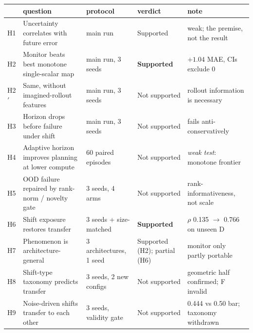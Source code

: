 \begin{tabular}{llllp{3.3cm}}
\toprule
& question & protocol & verdict & note \\
\midrule
H1 & Uncertainty correlates with future error & main run & Supported & weak; the premise, not the result \\
H2 & Monitor beats best monotone single-scalar map & main run, 3 seeds & \textbf{Supported} & $+1.04$ MAE, CIs exclude 0 \\
H2$'$ & Same, without imagined-rollout features & main run, 3 seeds & Not supported & rollout information is necessary \\
H3 & Horizon drops before failure under shift & main run, 3 seeds & Not supported & fails anti-conservatively \\
H4 & Adaptive horizon improves planning at lower compute & 60 paired episodes & Not supported & \emph{weak test}: monotone frontier \\
H5 & OOD failure repaired by rank-norm / novelty gate & 3 seeds, 4 arms & Not supported & rank-informativeness, not scale \\
H6 & Shift exposure restores transfer & 3 seeds + size-matched & \textbf{Supported} & $\rho$ 0.135 $\to$ 0.766 on unseen D \\
H7 & Phenomenon is architecture-general & 3 architectures, 1 seed & Supported (H2); partial (H6) & monitor only partly portable \\
H8 & Shift-type taxonomy predicts transfer & 3 seeds, 2 new configs & Not supported & geometric half confirmed; F invalid \\
H9 & Noise-driven shifts transfer to each other & 3 seeds, validity gate & Not supported & 0.444 vs 0.50 bar; taxonomy withdrawn \\
\bottomrule
\end{tabular}